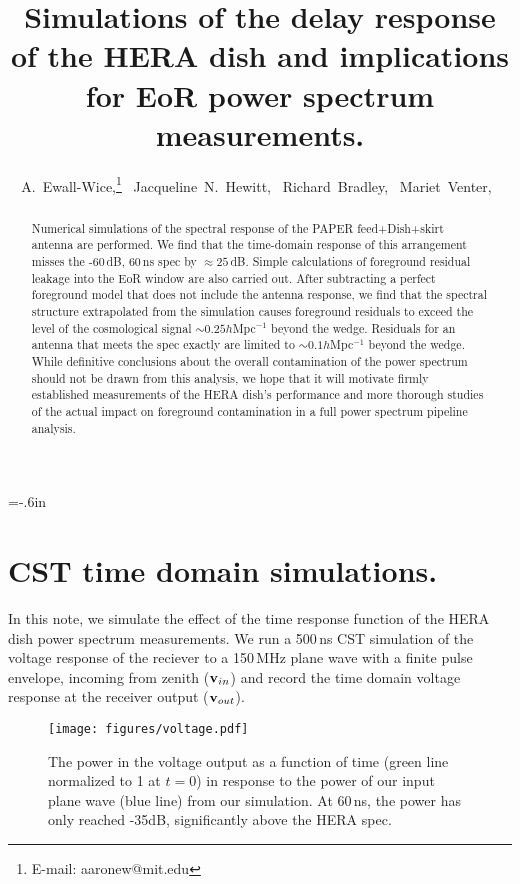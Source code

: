 \documentclass[useAMS,usenatbib]{mn2e}
\title{Simulations of the delay response of the HERA dish and implications for EoR power spectrum measurements.}
\author[A Ewall-Wice et al.]{A.~Ewall-Wice,\thanks{E-mail: aaronew@mit.edu}~
Jacqueline~N.~Hewitt,~
Richard~Bradley,~
Mariet~Venter,~
}
\begin{document}
\label{firstpage}
\pagerange{\pageref{firstpage}--\pageref{lastpage}}
\maketitle
\voffset=-.6in

\begin{abstract}
Numerical simulations of the spectral response of the PAPER feed+Dish+skirt antenna are performed. We find that the time-domain response of this arrangement misses the -60\,dB, 60\,ns spec by $\approx 25$\,dB. Simple calculations of foreground residual leakage into the EoR window are also carried out. After subtracting a perfect foreground model that does not include the antenna response, we find that the spectral structure extrapolated from the simulation causes foreground residuals to exceed the level of the cosmological signal $\sim 0.25h$Mpc$^{-1}$ beyond the wedge. Residuals for an antenna that meets the spec exactly are limited to $\sim 0.1h$Mpc$^{-1}$ beyond the wedge. While definitive conclusions about the overall contamination of the power spectrum should not be drawn from this analysis, we hope that it will motivate firmly established measurements of the HERA dish's performance and more thorough studies of the actual impact on foreground contamination in a full power spectrum pipeline analysis.
\end{abstract}


\section{CST time domain simulations.}
In this note, we simulate the effect of the time response function of the HERA dish power spectrum measurements. We run a 500\,ns CST simulation of the voltage response of the reciever to a 150\,MHz plane wave with a finite pulse envelope, incoming from zenith (${\bf v}_{in}$) and record the time domain voltage response at the receiver output (${\bf v}_{out}$). 



\begin{figure*}
\texttt{[image: figures/voltage.pdf]}
\caption{The power in the voltage output as a function of time (green line normalized to 1 at $t=0$) in response to the power of our input plane wave (blue line) from our simulation. At 60\,ns, the power has only reached -35dB, significantly above the HERA spec.}
\label{fig:voltageResponse}
\end{figure*}
\end{document}
